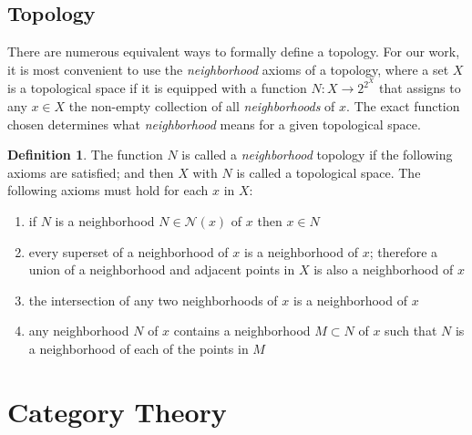 \documentclass{vgtc}
\theoremstyle{definition}
\newtheorem{definition}{Definition}[section]
\theoremstyle{remark}
\begin{document}
\subsection{Topology}
\label{sec:topology}

There are numerous equivalent ways to formally define a topology. For our work, it is most convenient to use the \textit{neighborhood} axioms of a topology, where a set $X$ is a topological space if it is equipped with a function $N:X\to 2^{2^X}$ that assigns to any $x\in X$ the non-empty collection of all \textit{neighborhoods} of $x$. The exact function chosen determines what \textit{neighborhood} means for a given topological space. 

\begin{definition}\label{def:topology}
The function $N$ is called a \textit{neighborhood} topology if the following axioms are satisfied; and then $X$ with $N$ is called a topological space. The following axioms must hold for each $x$ in $X$:\cite{brownronaldTopologyGroupoids2006}
\begin{enumerate}
  \item if $N$ is a neighborhood $N \in \mathcal{N}(x)$ of $x$ then $x \in N$
  \item every superset of a neighborhood of $x$ is a neighborhood of $x$; therefore a union of a neighborhood and adjacent points in $X$ is also a neighborhood of $x$
  \item the intersection of any two neighborhoods of $x$ is a neighborhood of $x$
  \item any neighborhood $N$ of $x$ contains a neighborhood $M \subset N$ of $x$ such that $N$ is a neighborhood of each of the points in $M$
\end{enumerate}
\end{definition}

\section{Category Theory}
\end{document}
